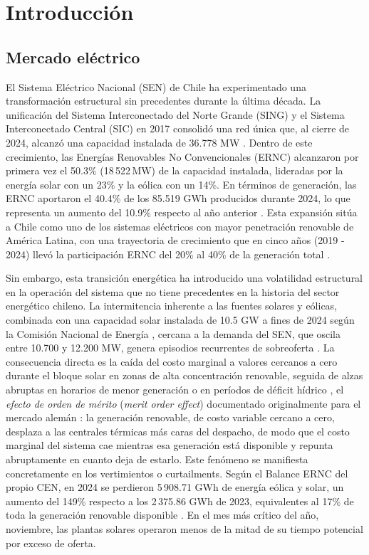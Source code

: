 \chapter{Introducción}

\section{Mercado eléctrico}

El Sistema Eléctrico Nacional (SEN) de Chile ha experimentado una transformación estructural sin precedentes durante la última década. La unificación del Sistema Interconectado del Norte Grande (SING) y el Sistema Interconectado Central (SIC) en 2017 consolidó una red única que, al cierre de 2024, alcanzó una capacidad instalada de 36.778 MW \cite{CEN2024}. Dentro de este crecimiento, las Energías Renovables No Convencionales (ERNC) alcanzaron por primera vez el 50.3\% (18\,522\,MW) de la capacidad instalada, lideradas por la energía solar con un 23\% y la eólica con un 14\%. En términos de generación, las ERNC aportaron el 40.4\% de los 85.519 GWh producidos durante 2024, lo que representa un aumento del 10.9\% respecto al año anterior \cite{CEN2024}. Esta expansión sitúa a Chile como uno de los sistemas eléctricos con mayor penetración renovable de América Latina, con una trayectoria de crecimiento que en cinco años (2019 - 2024) llevó la participación ERNC del 20\% al 40\% de la generación total \cite{LaTercera}.

Sin embargo, esta transición energética ha introducido una volatilidad estructural en la operación del sistema que no tiene precedentes en la historia del sector energético chileno. La intermitencia inherente a las fuentes solares y eólicas, combinada con una capacidad solar instalada de 10.5 GW a fines de 2024 según la Comisión Nacional de Energía \cite{PVMagazineChile2024}, cercana a la demanda del SEN, que oscila entre 10.700 y 12.200 MW, genera episodios recurrentes de sobreoferta \cite{LaTerceraPerdidas}. La consecuencia directa es la caída del costo marginal a valores cercanos a cero durante el bloque solar en zonas de alta concentración renovable, seguida de alzas abruptas en horarios de menor generación o en períodos de déficit hídrico \cite{REVE}, el \textit{efecto de orden de mérito} (\textit{merit order effect}) documentado originalmente para el mercado alemán \cite{SensfussEtAl2008}: la generación renovable, de costo variable cercano a cero, desplaza a las centrales térmicas más caras del despacho, de modo que el costo marginal del sistema cae mientras esa generación está disponible y repunta abruptamente en cuanto deja de estarlo. Este fenómeno se manifiesta concretamente en los vertimientos o curtailments. Según el Balance ERNC del propio CEN, en 2024 se perdieron 5\,908.71 GWh de energía eólica y solar, un aumento del 149\% respecto a los 2\,375.86 GWh de 2023, equivalentes al 17\% de toda la generación renovable disponible \cite{CENBalanceERNC2025}. En el mes más crítico del año, noviembre, las plantas solares operaron menos de la mitad de su tiempo potencial por exceso de oferta.

